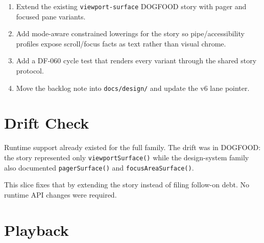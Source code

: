 \begin{enumerate}
\def\labelenumi{\arabic{enumi}.}
\tightlist
\item
  Extend the existing \texttt{v\allowbreak{}i\allowbreak{}e\allowbreak{}w\allowbreak{}p\allowbreak{}o\allowbreak{}r\allowbreak{}t\allowbreak{}-\allowbreak{}s\allowbreak{}u\allowbreak{}r\allowbreak{}f\allowbreak{}a\allowbreak{}c\allowbreak{}e} DOGFOOD story with pager and focused pane variants.
\item
  Add mode-aware constrained lowerings for the story so pipe/accessibility profiles expose scroll/focus facts as text rather than visual chrome.
\item
  Add a DF-060 cycle test that renders every variant through the shared story protocol.
\item
  Move the backlog note into \texttt{d\allowbreak{}o\allowbreak{}c\allowbreak{}s\allowbreak{}/\allowbreak{}d\allowbreak{}e\allowbreak{}s\allowbreak{}i\allowbreak{}g\allowbreak{}n\allowbreak{}/} and update the v6 lane pointer.
\end{enumerate}

\section{Drift Check}\label{record-100-drift-check}

Runtime support already existed for the full family. The drift was in DOGFOOD: the story represented only \texttt{v\allowbreak{}i\allowbreak{}e\allowbreak{}w\allowbreak{}p\allowbreak{}o\allowbreak{}r\allowbreak{}t\allowbreak{}S\allowbreak{}u\allowbreak{}r\allowbreak{}f\allowbreak{}a\allowbreak{}c\allowbreak{}e\allowbreak{}(\allowbreak{})} while the design-system family also documented \texttt{p\allowbreak{}a\allowbreak{}g\allowbreak{}e\allowbreak{}r\allowbreak{}S\allowbreak{}u\allowbreak{}r\allowbreak{}f\allowbreak{}a\allowbreak{}c\allowbreak{}e\allowbreak{}(\allowbreak{})} and \texttt{f\allowbreak{}o\allowbreak{}c\allowbreak{}u\allowbreak{}s\allowbreak{}A\allowbreak{}r\allowbreak{}e\allowbreak{}a\allowbreak{}S\allowbreak{}u\allowbreak{}r\allowbreak{}f\allowbreak{}a\allowbreak{}c\allowbreak{}e\allowbreak{}(\allowbreak{})}.

This slice fixes that by extending the story instead of filing follow-on debt. No runtime API changes were required.

\section{Playback}\label{record-100-playback}

